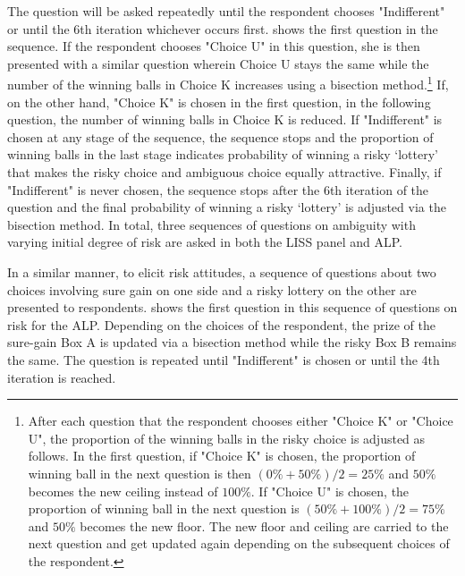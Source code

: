 \documentclass[]{article}
\begin{document}
The question will be asked repeatedly until the respondent chooses "Indifferent" or until the 6th iteration whichever occurs first.  shows the first question in the sequence. If the respondent chooses "Choice U" in this question, she is then presented with a similar question wherein Choice U stays the same while the number of the winning balls in Choice K increases using a bisection method.\footnote{After each question that the respondent chooses either "Choice K" or "Choice U", the proportion of the winning balls in the risky choice is adjusted as follows. In the first question, if "Choice K" is chosen, the proportion of winning ball in the next question is then $(0\% + 50\%)/2 = 25\%$ and $50\%$ becomes the new ceiling instead of $100\%$. If "Choice U" is chosen, the proportion of winning ball in the next question is $(50\% + 100\%)/2 = 75\%$ and $50\%$ becomes the new floor. The new floor and ceiling are carried to the next question and get updated again depending on the subsequent choices of the respondent.} If, on the other hand, "Choice K" is chosen in the first question, in the following question, the number of winning balls in Choice K is reduced. If "Indifferent" is chosen at any stage of the sequence, the sequence stops and the proportion of winning balls in the last stage indicates probability of winning a risky `lottery' that makes the risky choice and ambiguous choice equally attractive. Finally, if "Indifferent" is never chosen, the sequence stops after the 6th iteration of the question and the final probability of winning a risky `lottery' is adjusted via the bisection method. In total, three sequences of questions on ambiguity with varying initial degree of risk are asked in both the LISS panel and ALP.

In a similar manner, to elicit risk attitudes, a sequence of questions about two choices involving sure gain on one side and a risky lottery on the other are presented to respondents.  shows the first question in this sequence of questions on risk for the ALP. Depending on the choices of the respondent, the prize of the sure-gain Box A is updated via a bisection method while the risky Box B remains the same. The question is repeated until "Indifferent" is chosen or until the 4th iteration is reached.
\end{document}
